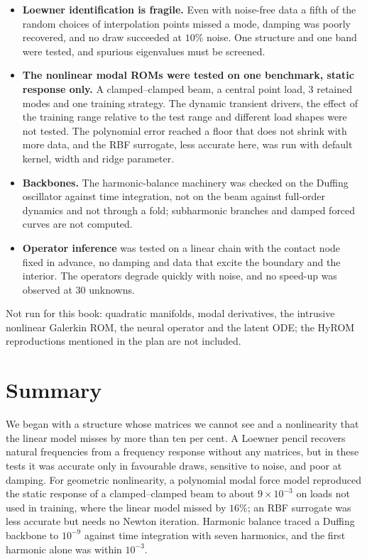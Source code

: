 \begin{limitsbox}
\begin{itemize}
\item \textbf{Loewner identification is fragile.} Even with noise-free data a fifth of the random choices of interpolation points missed a mode, damping was poorly recovered, and no draw succeeded at $10\%$ noise. One structure and one band were tested, and spurious eigenvalues must be screened.
\item \textbf{The nonlinear modal ROMs were tested on one benchmark, static response only.} A clamped--clamped beam, a central point load, $3$ retained modes and one training strategy. The dynamic transient drivers, the effect of the training range relative to the test range and different load shapes were not tested. The polynomial error reached a floor that does not shrink with more data, and the RBF surrogate, less accurate here, was run with default kernel, width and ridge parameter.
\item \textbf{Backbones.} The harmonic-balance machinery was checked on the Duffing oscillator against time integration, not on the beam against full-order dynamics and not through a fold; subharmonic branches and damped forced curves are not computed.
\item \textbf{Operator inference} was tested on a linear chain with the contact node fixed in advance, no damping and data that excite the boundary and the interior. The operators degrade quickly with noise, and no speed-up was observed at $30$ unknowns.
\end{itemize}
Not run for this book: quadratic manifolds, modal derivatives, the intrusive nonlinear Galerkin ROM, the neural operator and the latent ODE; the HyROM reproductions mentioned in the plan are not included.
\end{limitsbox}

\section{Summary}\label{sec:ni-summary}

We began with a structure whose matrices we cannot see and a nonlinearity that the linear model misses by more than ten per cent. A Loewner pencil recovers natural frequencies from a frequency response without any matrices, but in these tests it was accurate only in favourable draws, sensitive to noise, and poor at damping. For geometric nonlinearity, a polynomial modal force model reproduced the static response of a clamped--clamped beam to about $9\times10^{-3}$ on loads not used in training, where the linear model missed by $16\%$; an RBF surrogate was less accurate but needs no Newton iteration. Harmonic balance traced a Duffing backbone to $10^{-9}$ against time integration with seven harmonics, and the first harmonic alone was within $10^{-3}$.

